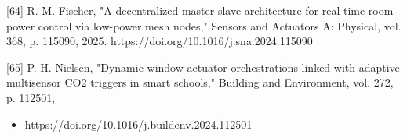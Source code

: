 [64] R. M. Fischer, "A decentralized master-slave architecture for real-time room power
control via low-power mesh nodes," Sensors and Actuators A: Physical, vol. 368, p.
115090, 2025. https://doi.org/10.1016/j.sna.2024.115090

[65] P. H. Nielsen, "Dynamic window actuator orchestrations linked with adaptive multisensor CO2 triggers in smart schools," Building and Environment, vol. 272, p. 112501,
\begin{itemize}
  \item https://doi.org/10.1016/j.buildenv.2024.112501
\end{itemize}





